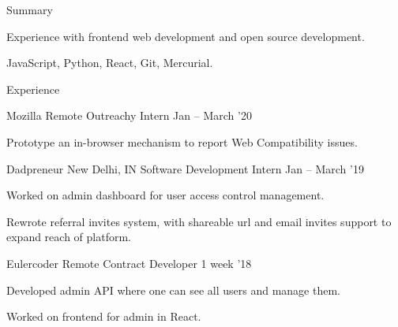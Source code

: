 \documentclass{resume} %
\begin{document}

\begin{rSection}{Summary}
  \begin{rSummarySection}
  {
    \item Experience with frontend web development and open source development.
    \item JavaScript, Python, React, Git, Mercurial.
  }
  \end{rSummarySection}
\end{rSection}


\begin{rSection}{Experience}
  \begin{rWorkSection}{Mozilla}
                      {Remote}
                      {Outreachy Intern}
                      {Jan -- March '20}
  {
    \item  Prototype an in-browser mechanism to report Web Compatibility issues.
  }
  \end{rWorkSection}

  \begin{rWorkSection}{Dadpreneur}
                     {New Delhi, IN}
                     {Software Development Intern}
                     {Jan -- March '19}
  {
    \item Worked on admin dashboard for user access control management.
    \item Rewrote referral invites system, with shareable url and email invites support to expand reach of platform.
  }
  \end{rWorkSection}

  \begin{rWorkSection}{Eulercoder}
                     {Remote}
                     {Contract Developer}
                     {1 week '18}
  {
    \item Developed admin API where one can see all users and manage them.
    \item Worked on frontend for admin in React.
  }
  \end{rWorkSection}
\end{rSection}
\end{document}
